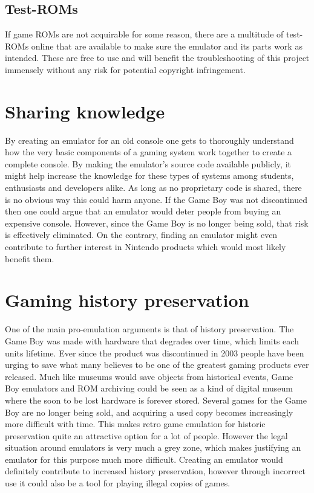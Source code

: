\subsection{Test-ROMs}

If game ROMs are not acquirable for some reason, there are a multitude of test-ROMs online that are available to make sure the emulator and its parts work as intended\cite{testROMs}. These are free to use and will benefit the troubleshooting of this project immensely without any risk for potential copyright infringement.


\section{Sharing knowledge}
By creating an emulator for an old console one gets to thoroughly understand how the very basic components of a gaming system work together to create a complete console. By making the emulator's source code available publicly, it might help increase the knowledge for these types of systems among students, enthusiasts and developers alike. As long as no proprietary code is shared, there is no obvious way this could harm anyone. If the Game Boy was not discontinued then one could argue that an emulator would deter people from buying an expensive console. However, since the Game Boy is no longer being sold, that risk is effectively eliminated. On the contrary, finding an emulator might even contribute to further interest in Nintendo products which would most likely benefit them.


\section{Gaming history preservation}
One of the main pro-emulation arguments is that of history preservation. The Game Boy was made with hardware that degrades over time, which limits each units lifetime. Ever since the product was discontinued in 2003\cite{gameBoyDisc} people have been urging to save what many believes to be one of the greatest gaming products ever released. Much like museums would save objects from historical events, Game Boy emulators and ROM archiving could be seen as a kind of digital museum where the soon to be lost hardware is forever stored. Several games for the Game Boy are no longer being sold, and acquiring a used copy becomes increasingly more difficult with time. This makes retro game emulation for historic preservation quite an attractive option for a lot of people. However the legal situation around emulators is very much a grey zone, which makes justifying an emulator for this purpose much more difficult. Creating an emulator would definitely contribute to increased history preservation, however through incorrect use it could also be a tool for playing illegal copies of games.

